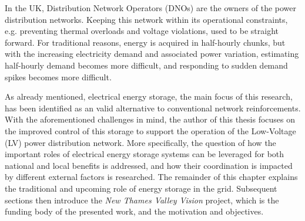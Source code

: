 In the UK, Distribution Network Operators (DNOs) are the owners of the power distribution networks.
Keeping this network within its operational constraints, e.g. preventing thermal overloads and voltage violations, used to be straight forward.
For traditional reasons, energy is acquired in half-hourly chunks, but with the increasing electricity demand and associated power variation, estimating half-hourly demand becomes more difficult, and responding to sudden demand spikes becomes more difficult.

As already mentioned, electrical energy storage, the main focus of this research, has been identified as an valid alternative to conventional network reinforcements.
With the aforementioned challenges in mind, the author of this thesis focuses on the improved control of this storage to support the operation of the Low-Voltage (LV) power distribution network.
More specifically, the question of how the important roles of electrical energy storage systems can be leveraged for both national and local benefits is addressed, and how their coordination is impacted by different external factors is researched.
The remainder of this chapter explains the traditional and upcoming role of energy storage in the grid.
Subsequent sections then introduce the \textit{New Thames Valley Vision} project, which is the funding body of the presented work, and the motivation and objectives.

